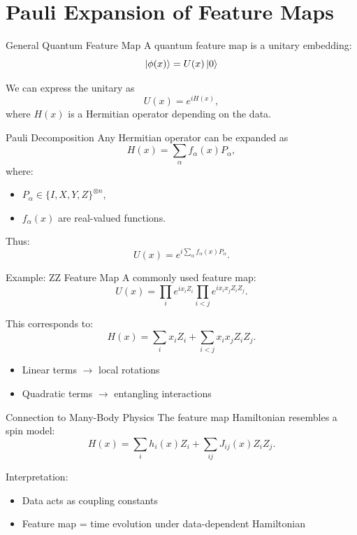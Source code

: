 \documentclass{beamer}
\begin{document}
\section{Pauli Expansion of Feature Maps}

\begin{frame}{General Quantum Feature Map}
A quantum feature map is a unitary embedding:
\[
\ket{\phi(x)} = U(x)\ket{0}
\]

We can express the unitary as
\[
U(x) = e^{i H(x)},
\]
where \(H(x)\) is a Hermitian operator depending on the data.
\end{frame}


\begin{frame}{Pauli Decomposition}
Any Hermitian operator can be expanded as
\[
H(x) = \sum_{\alpha} f_\alpha(x) P_\alpha,
\]
where:
\begin{itemize}
\item \(P_\alpha \in \{I,X,Y,Z\}^{\otimes n}\),
\item \(f_\alpha(x)\) are real-valued functions.
\end{itemize}

Thus:
\[
U(x) = e^{i \sum_\alpha f_\alpha(x) P_\alpha}.
\]
\end{frame}


\begin{frame}{Example: ZZ Feature Map}
A commonly used feature map:
\[
U(x) = \prod_i e^{i x_i Z_i}
\prod_{i<j} e^{i x_i x_j Z_i Z_j}.
\]

This corresponds to:
\[
H(x) = \sum_i x_i Z_i + \sum_{i<j} x_i x_j Z_i Z_j.
\]

\begin{itemize}
\item Linear terms $\rightarrow$ local rotations
\item Quadratic terms $\rightarrow$ entangling interactions
\end{itemize}
\end{frame}


\begin{frame}{Connection to Many-Body Physics}
The feature map Hamiltonian resembles a spin model:
\[
H(x) = \sum_i h_i(x) Z_i + \sum_{ij} J_{ij}(x) Z_i Z_j.
\]

Interpretation:
\begin{itemize}
\item Data acts as coupling constants
\item Feature map = time evolution under data-dependent Hamiltonian
\end{itemize}
\end{frame}
\end{document}
